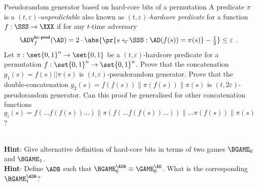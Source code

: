 \documentclass{crypto-exercise}
\author{Sven Laur}
\begin{document}
\begin{exercise}{Pseudorandom generator based on hard-core bits of a permutation}
A predicate $\pi$ is a \emph{$(t,\varepsilon)$-unpredictable} also known as \emph{$(t,\varepsilon)$-hardcore predicate} for a function $f:\SSS\to\XXX$ if for any $t$-time adversary
  \begin{align*}
    \advHCPredXX{f}{\AD}%
    =2\cdot\abs{\pr{s\getsu\SSS:\AD(f(s))=\pi(s)}-{\textstyle\frac{1}{2}}}\leq\varepsilon\enspace.
  \end{align*}
Let $\pi:\set{0,1}^n\to\set{0,1}$ be a $(t,\varepsilon)$-hardcore predicate for a permutation $f:\set{0,1}^n\to\set{0,1}^{n}$. 
Prove that the concatenation $g_1(s)=f(s)||\pi(s)$ is $(t,\varepsilon)$-pseudorandom generator. 
Prove that the double-concatenation $g_2(s)=f(f(s))\|\pi(f(s)) \|\pi(s)$ is $(t,2\varepsilon)$-pseudorandom generator. Can this proof be generalised for other concatenation functions $g_i(s)=f(\ldots f(f(s))\ldots)\|\pi(f(\ldots f(f(s))\ldots))\|\ldots \pi(f(s))\|\pi(s)$?    
\end{exercise}
\begin{solution}\ \\
\textbf{Hint}: Give alternative definition of hard-core bits in terms of two games $\BGAME_0$ and $\BGAME_1$.\\
\textbf{Hint}: Define $\ADB$ such that $\BGAME_0^\ADB\equiv \GAME_0^\AD$. What is the corresponding $\BGAME_1^\ADB$?\\
 


\end{solution}
\end{document}
